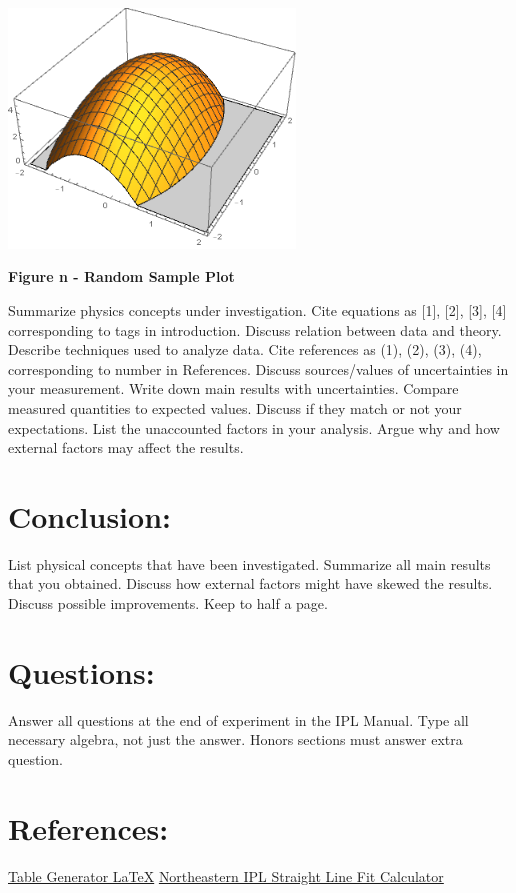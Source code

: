 \documentclass[12pt]{article}
\begin{document}
\begin{outline}[enumerate]
		\begin{center}
			\includegraphics[width=3in]{RandPlot}\\
			\begin{small} \textbf{
				Figure n - Random Sample Plot
			} \end{small}
		\end{center}
			\1 Summarize physics concepts under investigation.
				\2 Cite equations as [1], [2], [3], [4] corresponding to tags in introduction.
			\1 Discuss relation between data and theory.
		 	\1 Describe techniques used to analyze data.
		 		\2 Cite references as (1), (2), (3), (4), corresponding to number in References.
		 	\1 Discuss sources/values of uncertainties in your measurement.
			\1 Write down main results with uncertainties.
			\1 Compare measured quantities to expected values.
			\1 Discuss if they match or not your expectations.
			\1 List the unaccounted factors in your analysis.
			\1 Argue why and how external factors may affect the results.\\
		\end{outline}
		
	\section*{Conclusion:}
		\begin{outline}[enumerate]
			\1 List physical concepts that have been investigated.
			\1 Summarize all main results that you obtained.
		 	\1 Discuss how external factors might have skewed the results.
			\1 Discuss possible improvements.
			\1 Keep to half a page.
		\end{outline}
		
	\section*{Questions:}
		\begin{outline}[enumerate]
			\1 Answer all questions at the end of experiment in the IPL Manual.
			\1 Type all necessary algebra, not just the answer.
			\1 Honors sections must answer extra question.
		\end{outline}
		
	\section*{References:}
		\begin{outline}[enumerate]
			\1 \href{https://www.tablesgenerator.com/#}{Table Generator \LaTeX}
			\1 \href{https://web.northeastern.edu/ipl/data-analysis/straight-line-fit/}{Northeastern IPL Straight Line Fit Calculator}
		\end{outline}
		
\end{document}

